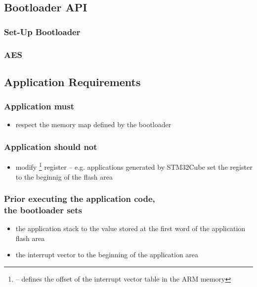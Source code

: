  
\clearpage
\subsection{Bootloader API} \label{sec:arch:api}
\subsubsection*{Set-Up Bootloader}

\subsubsection*{AES}


\clearpage
\subsection{Application Requirements}
\subsubsection*{Application must}
\begin{itemize}
  \item respect the memory map defined by the bootloader
\end{itemize}

\subsubsection*{Application should not}
\begin{itemize}
  \item modify \footnote{ -- defines the offset of the interrupt vector table in the ARM memory} register -- e.g. applications generated by STM32Cube set the  register to the beginnig of the flash area
\end{itemize}

\subsubsection*{Prior executing the application code,\\the bootloader sets}
\begin{itemize}
  \item the application stack to the value stored at the first word of the application flash area
  \item the interrupt vector to the beginning of the application area
\end{itemize}

